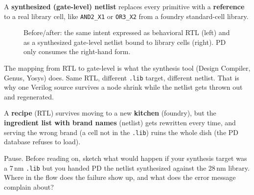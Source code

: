 A \textbf{synthesized (gate-level) netlist} replaces every primitive with a \textbf{reference} to a real library cell, like \texttt{AND2\_X1} or \texttt{OR3\_X2} from a foundry standard-cell library.

\begin{figure}[h]
\centering
{}
\caption{Before/after: the same intent expressed as behavioral RTL (left) and as a synthesized gate-level netlist bound to library cells (right). PD only consumes the right-hand form.}
\label{fig:rtl-vs-gate}
\end{figure}

The mapping from RTL to gate-level is what the synthesis tool (Design Compiler, Genus, Yosys) does. Same RTL, different \texttt{.lib} target, different netlist. That is why one Verilog source survives a node shrink while the netlist gets thrown out and regenerated.

\begin{hook}
A \textbf{recipe} (RTL) survives moving to a new \textbf{kitchen} (foundry), but the \textbf{ingredient list with brand names} (netlist) gets rewritten every time, and serving the wrong brand (a cell not in the \texttt{.lib}) ruins the whole dish (the PD database refuses to load).
\end{hook}

\begin{pausebox}
Pause. Before reading on, sketch what would happen if your synthesis target was a 7\,nm \texttt{.lib} but you handed PD the netlist synthesized against the 28\,nm library. Where in the flow does the failure show up, and what does the error message complain about?
\end{pausebox}

